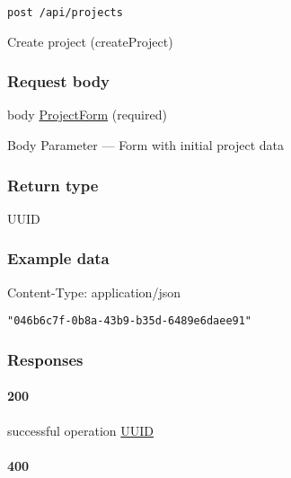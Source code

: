 

\protect\hypertarget{createProject}{}{}



\begin{verbatim}
post /api/projects
\end{verbatim}

Create project ({createProject})

\hypertarget{request-body-5}{%
\subsubsection*{Request body}\label{request-body-5}}

body \protect\hyperlink{ProjectForm}{ProjectForm} (required)

{Body Parameter} --- Form with initial project data

\hypertarget{return-type-17}{%
\subsubsection*{Return type}\label{return-type-17}}

UUID

\hypertarget{example-data-17}{%
\subsubsection*{Example data}\label{example-data-17}}

Content-Type: application/json

\begin{verbatim}
"046b6c7f-0b8a-43b9-b35d-6489e6daee91"
\end{verbatim}

\hypertarget{responses-17}{%
\subsubsection*{Responses}\label{responses-17}}

\hypertarget{section-59}{%
\paragraph{200}\label{section-59}}

successful operation \protect\hyperlink{UUID}{UUID}

\hypertarget{section-60}{%
\paragraph{400}\label{section-60}}

